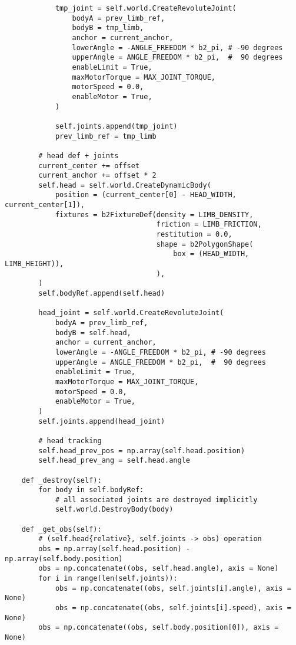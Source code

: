 \begin{itemize}
\begin{lstlisting}
            tmp_joint = self.world.CreateRevoluteJoint(
                bodyA = prev_limb_ref,
                bodyB = tmp_limb,
                anchor = current_anchor,
                lowerAngle = -ANGLE_FREEDOM * b2_pi, # -90 degrees
                upperAngle = ANGLE_FREEDOM * b2_pi,  #  90 degrees
                enableLimit = True,
                maxMotorTorque = MAX_JOINT_TORQUE,
                motorSpeed = 0.0,
                enableMotor = True,
            )

            self.joints.append(tmp_joint)
            prev_limb_ref = tmp_limb

        # head def + joints
        current_center += offset
        current_anchor += offset * 2
        self.head = self.world.CreateDynamicBody(
            position = (current_center[0] - HEAD_WIDTH, current_center[1]),
            fixtures = b2FixtureDef(density = LIMB_DENSITY,
                                    friction = LIMB_FRICTION,
                                    restitution = 0.0,
                                    shape = b2PolygonShape(
                                        box = (HEAD_WIDTH, LIMB_HEIGHT)),
                                    ),
        )
        self.bodyRef.append(self.head)

        head_joint = self.world.CreateRevoluteJoint(
            bodyA = prev_limb_ref,
            bodyB = self.head,
            anchor = current_anchor,
            lowerAngle = -ANGLE_FREEDOM * b2_pi, # -90 degrees
            upperAngle = ANGLE_FREEDOM * b2_pi,  #  90 degrees
            enableLimit = True,
            maxMotorTorque = MAX_JOINT_TORQUE,
            motorSpeed = 0.0,
            enableMotor = True,
        )
        self.joints.append(head_joint)

        # head tracking
        self.head_prev_pos = np.array(self.head.position)
        self.head_prev_ang = self.head.angle

    def _destroy(self):
        for body in self.bodyRef:
            # all associated joints are destroyed implicitly
            self.world.DestroyBody(body)

    def _get_obs(self):
        # (self.head{relative}, self.joints -> obs) operation
        obs = np.array(self.head.position) - np.array(self.body.position)
        obs = np.concatenate((obs, self.head.angle), axis = None)
        for i in range(len(self.joints)):
            obs = np.concatenate((obs, self.joints[i].angle), axis = None)
            obs = np.concatenate((obs, self.joints[i].speed), axis = None)
        obs = np.concatenate((obs, self.body.position[0]), axis = None)


\end{lstlisting}
\end{itemize}
